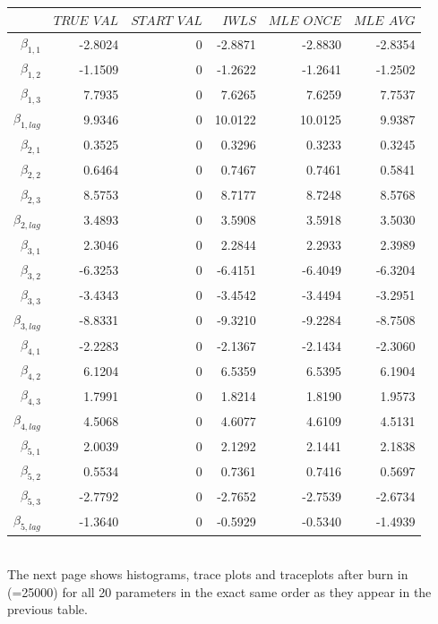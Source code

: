 \documentclass[a4paper,12pt]{scrartcl} %
\begin{document}
\begin{table}[ht]
	\centering
	\begin{tabular}{rrrrrr}
		\hline
		& $TRUE$ $VAL$ & $START$ $VAL$ & $IWLS$ & $MLE$ $ONCE$ & $MLE$ $AVG$ \\ 
		\hline
		$\beta_{1,1}$ & -2.8024 & 0 &-2.8871 & -2.8830 & -2.8354 \\ 
		$\beta_{1,2}$ & -1.1509 & 0 &-1.2622 & -1.2641 & -1.2502 \\ 
		$\beta_{1,3}$ & 7.7935 & 0 &7.6265 & 7.6259 & 7.7537 \\ 
		$\beta_{1,lag}$ & 9.9346 &0 & 10.0122 & 10.0125 & 9.9387 \\ 
		$\beta_{2,1}$ & 0.3525 & 0 &0.3296 & 0.3233 & 0.3245 \\ 
		$\beta_{2,2}$ & 0.6464 & 0 &0.7467 & 0.7461 & 0.5841 \\ 
		$\beta_{2,3}$ & 8.5753 & 0 &8.7177 & 8.7248 & 8.5768 \\ 
		$\beta_{2,lag}$ & 3.4893 & 0 &3.5908 & 3.5918 & 3.5030 \\ 
		$\beta_{3,1}$ & 2.3046 & 0 &2.2844 & 2.2933 & 2.3989 \\ 
		$\beta_{3,2}$ & -6.3253 & 0 &-6.4151 & -6.4049 & -6.3204 \\ 
		$\beta_{3,3}$ & -3.4343 & 0 &-3.4542 & -3.4494 & -3.2951 \\ 
		$\beta_{3,lag}$ & -8.8331 & 0 &-9.3210 & -9.2284 & -8.7508 \\ 
		$\beta_{4,1}$ & -2.2283 & 0 &-2.1367 & -2.1434 & -2.3060 \\ 
		$\beta_{4,2}$ & 6.1204 & 0 &6.5359 & 6.5395 & 6.1904 \\ 
		$\beta_{4,3}$ & 1.7991 & 0 &1.8214 & 1.8190 & 1.9573 \\ 
		$\beta_{4,lag}$ & 4.5068 & 0 &4.6077 & 4.6109 & 4.5131 \\ 
		$\beta_{5,1}$ & 2.0039 & 0 &2.1292 & 2.1441 & 2.1838 \\ 
		$\beta_{5,2}$ & 0.5534 & 0 &0.7361 & 0.7416 & 0.5697 \\ 
		$\beta_{5,3}$ & -2.7792 & 0 &-2.7652 & -2.7539 & -2.6734 \\ 
		$\beta_{5,lag}$ & -1.3640 & 0 &-0.5929 & -0.5340 & -1.4939 \\ 
		\hline
	\end{tabular}
\end{table}
\\
The next page shows histograms, trace plots and traceplots after burn in (=25000) for all 20 parameters in the exact same order as they appear in the previous table.\\
\end{document}
